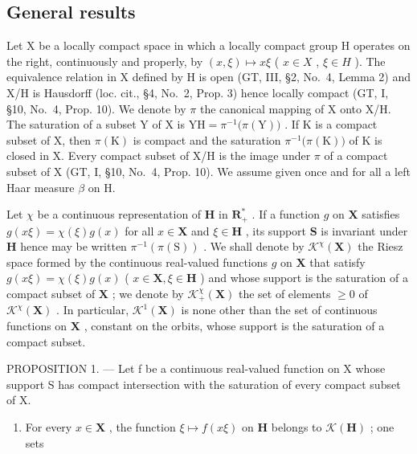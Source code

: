 \subsection{General results}

Let X be a locally compact space in which a locally compact group H operates on the right, continuously and properly, by \((x,\xi)\mapsto x\xi\) ( \(x\in X\) , \(\xi\in H\) ). The equivalence relation in X defined by H is open (GT, III, §2, No.~4, Lemma 2) and X/H is Hausdorff (loc. cit., §4, No.~2, Prop. 3) hence locally compact (GT, I, §10, No.~4, Prop. 10). We denote by \(\pi\) the canonical mapping of X onto X/H. The saturation of a subset Y of X is \(\mathrm{YH}=\pi^{-1}\big(\pi(\mathrm{Y})\big)\) . If K is a compact subset of X, then \(\pi(\mathrm{K})\) is compact and the saturation \(\pi^{-1}\big(\pi(\mathrm{K})\big)\) of K is closed in X. Every compact subset of X/H is the image under \(\pi\) of a compact subset of X (GT, I, §10, No.~4, Prop. 10). We assume given once and for all a left Haar measure \(\beta\) on H.

Let \(\chi\) be a continuous representation of \(\mathbf{H}\) in \(\mathbf{R}_+^*\) . If a function \(g\) on \(\mathbf{X}\) satisfies \(g(x\xi) = \chi (\xi)g(x)\) for all \(x\in \mathbf{X}\) and \(\xi \in \mathbf{H}\) , its support \(\mathbf{S}\) is invariant under \(\mathbf{H}\) hence may be written \(\pi^{-1} (\pi (\mathrm{S}))\) . We shall denote by \(\mathcal{K}^{\chi}(\mathbf{X})\) the Riesz space formed by the continuous real-valued functions \(g\) on \(\mathbf{X}\) that satisfy \(g(x\xi) = \chi (\xi)g(x)\) ( \(x\in \mathbf{X},\xi \in \mathbf{H}\) ) and whose support is the saturation of a compact subset of \(\mathbf{X}\) ; we denote by \(\mathcal{K}_+^\chi (\mathbf{X})\) the set of elements \(\geqslant 0\) of \(\mathcal{K}^{\chi}(\mathbf{X})\) . In particular, \(\mathcal{K}^1 (\mathbf{X})\) is none other than the set of continuous functions on \(\mathbf{X}\) , constant on the orbits, whose support is the saturation of a compact subset.

PROPOSITION 1. --- Let f be a continuous real-valued function on X whose support S has compact intersection with the saturation of every compact subset of X.

\begin{enumerate}
\def\labelenumi{\alph{enumi})}
\tightlist
\item
  For every \(x \in \mathbf{X}\) , the function \(\xi \mapsto f(x\xi)\) on \(\mathbf{H}\) belongs to \(\mathcal{K}(\mathbf{H})\) ; one sets
\end{enumerate}

